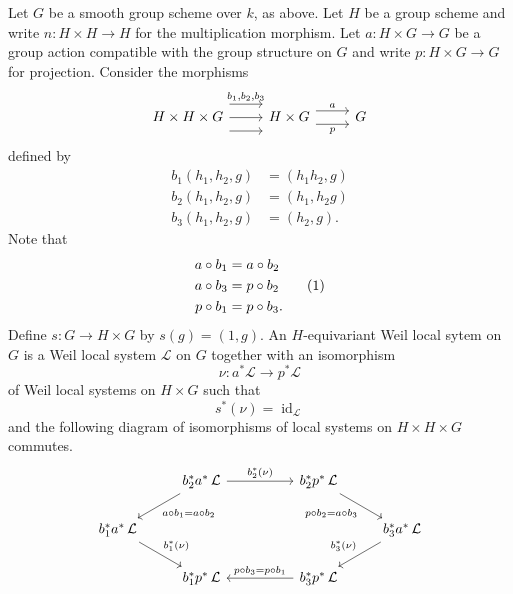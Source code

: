 \documentclass[10pt]{amsart}
\theoremstyle{plain}
\theoremstyle{definition}
\DeclareMathOperator{\id}{id}
\newcommand{\iso}{{\ \cong\ }}
\newcommand{\cs}[1]{{\mathcal{#1}}}
\newcommand\numberthis{\addtocounter{equation}{1}\tag{\theequation}}
\begin{document}
Let $G$ be a smooth group scheme over $k$, as above.
Let $H$ be a group scheme and write $n : H \times H \to H$ for the multiplication morphism.
Let $a : H \times G\to G$ be a group action compatible with the group structure on $G$ and write $p : H\times G \to G$ for projection. 
Consider the morphisms
\[
\begin{tikzcd}
H \times H \times G 
\arrow[shift left=4]{r}{b_1, b_2, b_3} 
\arrow{r}{}
\arrow[shift right=4]{r}{} 
& H \times G 
\arrow[shift left=2]{r}{a}
\arrow[shift right=2]{r}[swap]{p}
 & G 
\end{tikzcd}
\]
defined by 
\begin{align*}
b_1(h_1,h_2,g) &= (h_1h_2,g) \\
b_2(h_1,h_2,g) &= (h_1,h_2g) \\
b_3(h_1,h_2,g) &= (h_2,g).
\end{align*}
Note that
\begin{align*}
a\circ b_1 &= a\circ b_2 \\
a\circ b_3 &= p\circ b_2 \numberthis \label{eqn:bap}\\
p\circ b_1 &= p\circ b_3.
\end{align*}
Define $s : G\to H\times G$ by $s(g) = (1,g)$.
An $H$-equivariant Weil local sytem on $G$ is a Weil local system $\cs{L}$ on $G$ together with an isomorphism  
\[
\nu : a^*\cs{L} \to p^*\cs{L}
\] 
of Weil local systems on $H\times G$ such that 
\begin{equation}\label{E1}
s^*(\nu) = \id_{\cs{L}}
\end{equation}
and the following diagram of isomorphisms of local systems on $H\times H\times G$ commutes.
\begin{equation}\label{E2}
\begin{tikzcd}
\ &  \arrow{dl}{a\circ b_1 = a\circ b_2}  b_2^*  a^*\, \mathcal{L} \arrow{rr}{b_2^*(\nu)} && b_2^* p^*\, \mathcal{L} \arrow{dr}[swap]{p\circ b_2 = a\circ b_3} & \\
b_1^* a^*\, \mathcal{L} \arrow{dr}{b_1^*(\nu)} &&&&   \arrow{dl}[swap]{b_3^*(\nu)} b_3^* a^*\, \mathcal{L} \\
& b_1^* p^*\, \mathcal{L}  && \arrow{ll}[swap]{p\circ b_3 = p\circ b_1} b_3^* p^*\, \mathcal{L} & 
\end{tikzcd}
\end{equation}
\end{document}

